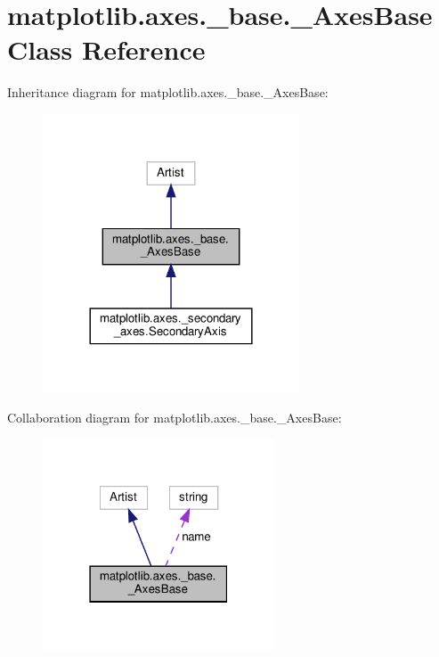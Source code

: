 \hypertarget{classmatplotlib_1_1axes_1_1__base_1_1__AxesBase}{}\section{matplotlib.\+axes.\+\_\+base.\+\_\+\+Axes\+Base Class Reference}
\label{classmatplotlib_1_1axes_1_1__base_1_1__AxesBase}


Inheritance diagram for matplotlib.\+axes.\+\_\+base.\+\_\+\+Axes\+Base\+:
\nopagebreak
\begin{figure}[H]
\begin{center}
\leavevmode
\includegraphics[width=216pt]{classmatplotlib_1_1axes_1_1__base_1_1__AxesBase__inherit__graph}
\end{center}
\end{figure}


Collaboration diagram for matplotlib.\+axes.\+\_\+base.\+\_\+\+Axes\+Base\+:
\nopagebreak
\begin{figure}[H]
\begin{center}
\leavevmode
\includegraphics[width=195pt]{classmatplotlib_1_1axes_1_1__base_1_1__AxesBase__coll__graph}
\end{center}
\end{figure}
